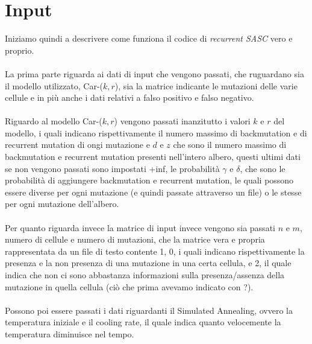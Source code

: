 \documentclass[12pt]{report}
\begin{document}
  \section{Input}
  Iniziamo quindi a descrivere come funziona il codice di \emph{recurrent SASC} vero e proprio.\\\\
  La prima parte riguarda ai dati di input che vengono passati, che ruguardano sia il modello utilizzato, Car-($k, r$), sia la matrice indicante le mutazioni delle varie cellule e in più anche i dati relativi a falso positivo e falso negativo.\\\\
  Riguardo al modello Car-($k, r$) vengono passati inanzitutto i valori $k$ e $r$ del modello, i quali indicano rispettivamente il numero massimo di backmutation e di recurrent mutation di ongi mutazione e $d$ e $z$ che sono il numero massimo di backmutation e recurrent mutation presenti nell'intero albero, questi ultimi dati se non vengono passati sono impostati +inf, le probabilità $\gamma$ e $\delta$, che sono le probabilità di aggiungere backmutation e recurrent mutation, le quali possono essere diverse per ogni mutazione (e quindi passate attraverso un file) o le stesse per ogni mutazione dell'albero.\\\\
  Per quanto riguarda invece la matrice di input invece vengono sia passati $n$ e $m$, numero di cellule e numero di mutazioni, che la matrice vera e propria rappresentata da un file di testo contente 1, 0, i quali indicano rispettivamente la presenza e la non presenza di una mutazione in una certa cellula, e 2, il quale indica che non ci sono abbastanza informazioni sulla presenza/assenza della mutazione in quella cellula (ciò che prima avevamo indicato con ?).\\\\
  Possono poi essere passati i dati riguardanti il Simulated Annealing, ovvero la temperatura iniziale e il cooling rate, il quale indica quanto velocemente la temperatura diminuisce nel tempo.
\end{document}
